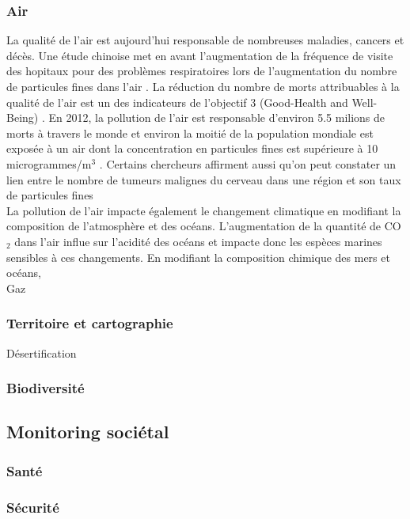 \documentclass[10pt, conference, compsocconf]{llncs}
\begin{document}
		\subsubsection{Air}
			La qualité de l'air est aujourd'hui responsable de nombreuses maladies, cancers et décès. Une étude chinoise met en avant l'augmentation de la fréquence de visite des hopitaux pour des problèmes respiratoires lors de l'augmentation du nombre de particules fines dans l'air \cite{liu_effects_2016}. La réduction du nombre de morts attribuables à la qualité de l'air est un des indicateurs de l'objectif 3 (Good-Health and Well-Being) \cite{united_nations_goal_nodate-5}. En 2012, la pollution de l'air est responsable d'environ 5.5 milions de morts à travers le monde et environ la moitié de la population mondiale est exposée à un air dont la concentration en particules fines est supérieure à 10 microgrammes/m$^{3}$ \cite{yale_university_epi_2016}. Certains chercheurs affirment aussi qu'on peut constater un lien entre le nombre de tumeurs malignes du cerveau dans une région et son taux de particules fines \cite{andersen_long-term_nodate} \\
			La pollution de l'air impacte également le changement climatique en modifiant la composition de l'atmosphère et des océans. L'augmentation de la quantité de CO$_{2}$ dans l'air influe sur l'acidité des océans et impacte donc les espèces marines sensibles à ces changements. En modifiant la composition chimique des mers et océans,  \\
			Gaz
			
		\subsubsection{Territoire et cartographie}
			Désertification
			
		\subsubsection{Biodiversité}
	
	\subsection{Monitoring sociétal}
		\subsubsection{Santé}
		\subsubsection{Sécurité}
\end{document}
